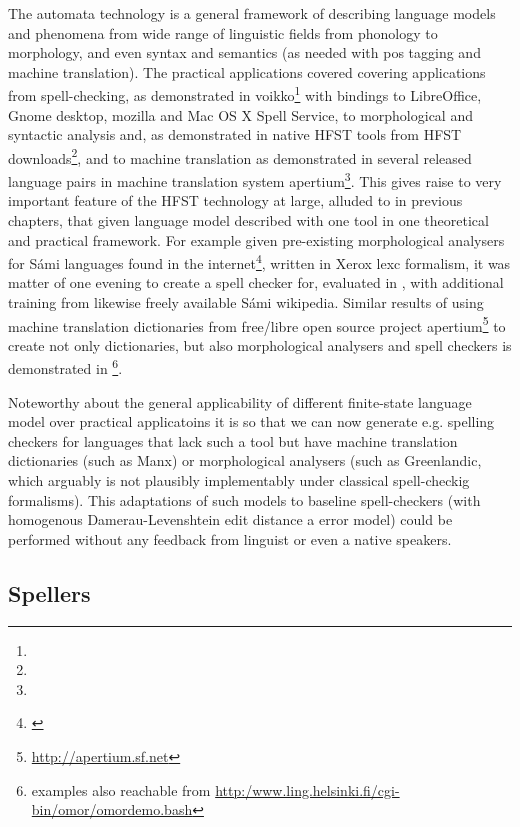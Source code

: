 \documentclass{llncs}
\begin{document}
The automata technology is a general framework of describing language models
and phenomena from wide range of linguistic fields from phonology to
morphology, and even syntax and semantics (as needed with pos tagging and
machine translation).  The practical applications covered  covering
applications from spell-checking, as demonstrated in voikko\footnote{} with
bindings to LibreOffice, Gnome desktop, mozilla and Mac OS X Spell Service, to
morphological and syntactic analysis and, as demonstrated in native HFST tools
from HFST downloads\footnote{}, and to machine translation as demonstrated in
several released language pairs in machine translation system
apertium\footnote{}. This gives raise to very important feature of the HFST
technology at large, alluded to in previous chapters, that given language model
described with one tool in one theoretical and practical framework. For example
given pre-existing morphological analysers for Sámi languages found in the
internet\footnote{\url{}}, written in Xerox lexc formalism, it was matter of
one evening to create a spell checker for, evaluated in
\cite{pirinen/2010/lrec}, with additional training from likewise freely
available Sámi wikipedia. Similar results of using machine translation
dictionaries from free/libre open source project
apertium\footnote{\url{http://apertium.sf.net}} to create not only
dictionaries, but also morphological analysers and spell checkers is
demonstrated in \cite{pirinen/lrec/2012} \footnote{examples also reachable from
\url{http:/www.ling.helsinki.fi/cgi-bin/omor/omordemo.bash}}.  

Noteworthy about the general applicability of different finite-state
language model over practical applicatoins it is so that we can now generate
e.g. spelling checkers for languages that lack such a tool but have machine
translation dictionaries (such as Manx) or morphological analysers (such as
Greenlandic, which arguably is not plausibly implementably under classical
spell-checkig formalisms). This adaptations of such models to baseline
spell-checkers (with homogenous Damerau-Levenshtein edit distance a
error model) could be performed without any feedback from linguist or
even a native speakers.

\subsection{Spellers}
\end{document}
